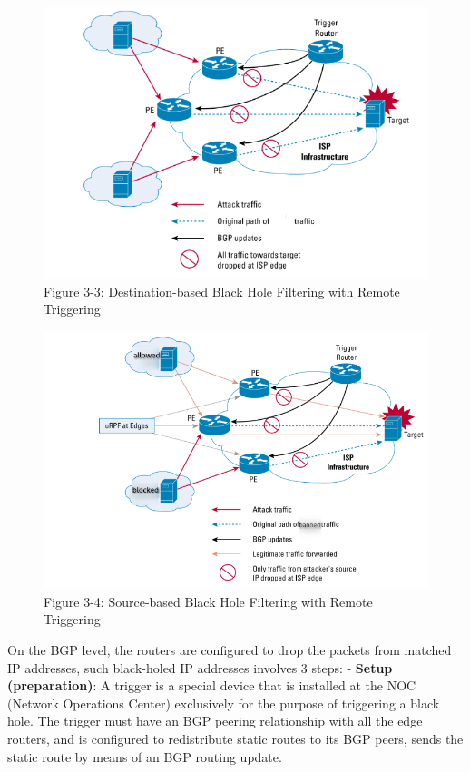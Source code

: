 \documentclass[nonacm,sigplan,screen]{acmart}
\begin{document}
\begin{figure}
\centering
\includegraphics[width=\columnwidth]{res/3-3-cisco.png}
\caption{Figure 3-3: Destination-based Black Hole Filtering with Remote
Triggering}
\end{figure}

\begin{figure}
\centering
\includegraphics[width=\columnwidth]{res/3-4-cisco-source.png}
\caption{Figure 3-4: Source-based Black Hole Filtering with Remote
Triggering}
\end{figure}

On the BGP level, the routers are configured to drop the packets from
matched IP addresses, such black-holed IP addresses involves 3 steps:
\cite{13_blackhole_cisco} \cite{14_blackhole_rfc} - \textbf{Setup
(preparation)}: A trigger is a special device that is installed at the
NOC (Network Operations Center) exclusively for the purpose of
triggering a black hole. The trigger must have an BGP peering
relationship with all the edge routers, and is configured to
redistribute static routes to its BGP peers, sends the static route by
means of an BGP routing update.
\end{document}

